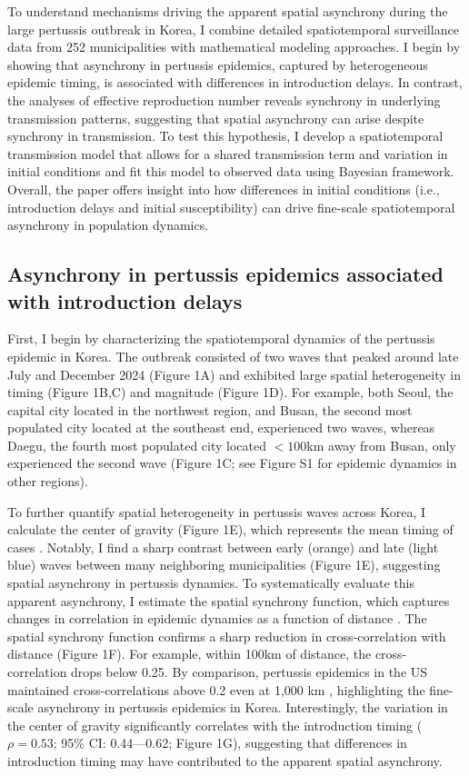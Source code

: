 \documentclass[12pt]{article}
\begin{document}
To understand mechanisms driving the apparent spatial asynchrony during the large pertussis outbreak in Korea, I combine detailed spatiotemporal surveillance data from 252 municipalities with mathematical modeling approaches.
I begin by showing that asynchrony in pertussis epidemics, captured by heterogeneous epidemic timing, is associated with differences in introduction delays.
In contrast, the analyses of effective reproduction number reveals synchrony in underlying transmission patterns, suggesting that spatial asynchrony can arise despite synchrony in transmission.
To test this hypothesis, I develop a spatiotemporal transmission model that allows for a shared transmission term and variation in initial conditions and fit this model to observed data using Bayesian framework.
Overall, the paper offers insight into how differences in initial conditions (i.e., introduction delays and initial susceptibility) can drive fine-scale spatiotemporal asynchrony in population dynamics.

\subsection*{Asynchrony in pertussis epidemics associated with introduction delays}

First, I begin by characterizing the spatiotemporal dynamics of the pertussis epidemic in Korea.
The outbreak consisted of two waves that peaked around late July and December 2024 (Figure 1A) and exhibited large spatial heterogeneity in timing (Figure 1B,C) and magnitude (Figure 1D).
For example, both Seoul, the capital city located in the northwest region, and Busan, the second most populated city located at the southeast end, experienced two waves, whereas Daegu, the fourth most populated city located $<100$km away from Busan, only experienced the second wave (Figure 1C; see Figure S1 for epidemic dynamics in other regions).

To further quantify spatial heterogeneity in pertussis waves across Korea, I calculate the center of gravity (Figure 1E), which represents the mean timing of cases \citep{pitzer2015environmental}.
Notably, I find a sharp contrast between early (orange) and late (light blue) waves between many neighboring municipalities (Figure 1E), suggesting spatial asynchrony in pertussis dynamics.
To systematically evaluate this apparent asynchrony, I estimate the spatial synchrony function, which captures changes in correlation in epidemic dynamics as a function of distance \citep{grenfell2001travelling}.
The spatial synchrony function confirms a sharp reduction in cross-correlation with distance (Figure 1F).
For example, within 100km of distance, the cross-correlation drops below 0.25.
By comparison, pertussis epidemics in the US maintained cross-correlations above 0.2 even at 1,000 km \citep{choisy2012changing}, highlighting the fine-scale asynchrony in pertussis epidemics in Korea.
Interestingly, the variation in the center of gravity significantly correlates with the introduction timing ($\rho=0.53$; 95\% CI: 0.44---0.62; Figure 1G), suggesting that differences in introduction timing may have contributed to the apparent spatial asynchrony.
\end{document}
